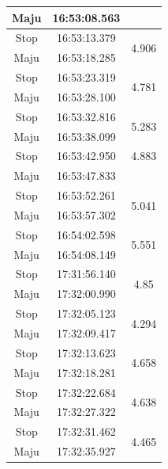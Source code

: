 \begin{longtable}{|c|c|c|}
  Maju           & 16:53:08.563        &                         \\ \hline
  Stop           & 16:53:13.379        & \multirow{2}{*}{4.906}  \\ \cline{1-2}
  Maju           & 16:53:18.285        &                         \\ \hline
  Stop           & 16:53:23.319        & \multirow{2}{*}{4.781}  \\ \cline{1-2}
  Maju           & 16:53:28.100        &                         \\ \hline
  Stop           & 16:53:32.816        & \multirow{2}{*}{5.283}  \\ \cline{1-2}
  Maju           & 16:53:38.099        &                         \\ \hline
  Stop           & 16:53:42.950        & 4.883  \\ \hline
  Maju           & 16:53:47.833        &                         \\ \hline
  Stop           & 16:53:52.261        & \multirow{2}{*}{5.041}  \\ \cline{1-2}
  Maju           & 16:53:57.302        &                         \\ \hline
  Stop           & 16:54:02.598        & \multirow{2}{*}{5.551}  \\ \cline{1-2}
  Maju           & 16:54:08.149        &                         \\ \hline
  Stop           & 17:31:56.140        & \multirow{2}{*}{4.85}   \\ \cline{1-2}
  Maju           & 17:32:00.990        &                         \\ \hline
  Stop           & 17:32:05.123        & \multirow{2}{*}{4.294}  \\ \cline{1-2}
  Maju           & 17:32:09.417        &                         \\ \hline
  Stop           & 17:32:13.623        & \multirow{2}{*}{4.658}  \\ \cline{1-2}
  Maju           & 17:32:18.281        &                         \\ \hline
  Stop           & 17:32:22.684        & \multirow{2}{*}{4.638}  \\ \cline{1-2}
  Maju           & 17:32:27.322        &                         \\ \hline
  Stop           & 17:32:31.462        & \multirow{2}{*}{4.465}  \\ \cline{1-2}
  Maju           & 17:32:35.927        &                         \\ \hline

\end{longtable}
